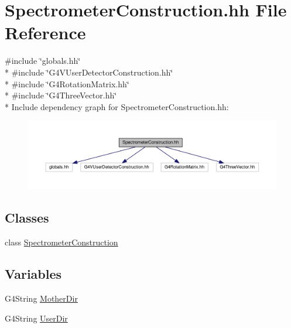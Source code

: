 \hypertarget{SpectrometerConstruction_8hh}{}\section{Spectrometer\+Construction.\+hh File Reference}
\label{SpectrometerConstruction_8hh}
{\ttfamily \#include \char`\"{}globals.\+hh\char`\"{}}\\*
{\ttfamily \#include \char`\"{}G4\+V\+User\+Detector\+Construction.\+hh\char`\"{}}\\*
{\ttfamily \#include \char`\"{}G4\+Rotation\+Matrix.\+hh\char`\"{}}\\*
{\ttfamily \#include \char`\"{}G4\+Three\+Vector.\+hh\char`\"{}}\\*
Include dependency graph for Spectrometer\+Construction.\+hh\+:
\nopagebreak
\begin{figure}[H]
\begin{center}
\leavevmode
\includegraphics[width=350pt]{SpectrometerConstruction_8hh__incl}
\end{center}
\end{figure}
\subsection*{Classes}
\begin{DoxyCompactItemize}
\item 
class \hyperlink{classSpectrometerConstruction}{Spectrometer\+Construction}
\end{DoxyCompactItemize}
\subsection*{Variables}
\begin{DoxyCompactItemize}
\item 
G4\+String \hyperlink{SpectrometerConstruction_8hh_a28a3faf9b4768b420044f0d81fa645b7}{Mother\+Dir}
\item 
G4\+String \hyperlink{SpectrometerConstruction_8hh_a8558631b93942e4ae79b3feb21c97c8f}{User\+Dir}
\end{DoxyCompactItemize}


